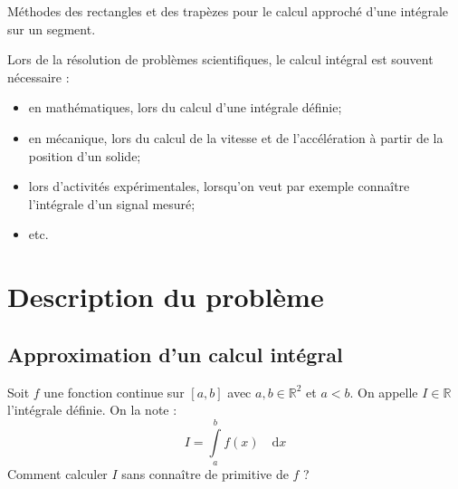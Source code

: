 \documentclass[10pt]{article}
\begin{document}
\begin{savoir}
Méthodes des rectangles et des trapèzes pour le calcul approché d’une intégrale sur un segment.
\end{savoir}

Lors de la résolution de problèmes scientifiques, le calcul intégral est souvent nécessaire :
\begin{itemize}
\item en mathématiques, lors du calcul d'une intégrale définie;
\item en mécanique, lors du calcul de la vitesse et de l'accélération à partir de la position d'un solide;
\item lors d'activités expérimentales, lorsqu'on veut par exemple connaître l'intégrale d'un signal mesuré;
\item etc.
\end{itemize}

\setlength{\parskip}{0ex plus 0.2ex minus 0ex}
 \renewcommand{\contentsname}{}
 \renewcommand{\baselinestretch}{1}

\tableofcontents

 \renewcommand{\baselinestretch}{1.2}
\setlength{\parskip}{2ex plus 0.5ex minus 0.2ex}


\section{Description du problème}
\subsection{Approximation d'un calcul intégral}
\begin{prob}
Soit $f$ une fonction continue sur $[a,b]$ avec $a,b \in \mathbb{R}^2$ et $a<b$. On appelle $I\in\mathbb{R}$ l'intégrale définie. On la note :
$$
I = \int\limits_{a}^b f(x) \quad \mathrm{d} x
$$
Comment calculer $I$ sans connaître de primitive de $f$ ?
\end{prob}
\end{document}
